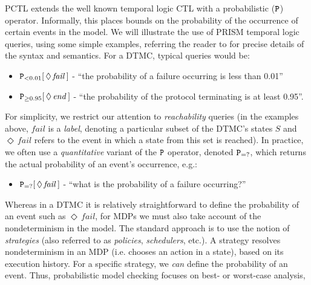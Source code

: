 \documentclass{llncs}
\begin{document}
PCTL extends the well known temporal logic CTL  with a probabilistic ($\tt P$) operator.
Informally, this places bounds on the probability of the occurrence of certain events in the model.
We will illustrate the use of PRISM temporal logic queries, using some simple examples,
referring the reader to \cite{HJ94,KNP07a} for precise details of the syntax and semantics.
For a DTMC, typical queries would be:
\begin{itemize}
\item ${\tt P}_{<0.01}[\,\Diamond\,\mathit{fail}\,]$ -
``the probability of a failure occurring is less than 0.01''
\item ${\tt P}_{\geq 0.95}[\,\Diamond\,\mathit{end}\,]$ -
``the probability of the protocol terminating is at least 0.95''.
\end{itemize}
For simplicity, we restrict our attention to \emph{reachability} queries
(in the examples above, $\mathit{fail}$ is a \emph{label}, denoting a particular subset of the DTMC's states $S$
and $\Diamond\,\mathit{fail}$ refers to the event in which a state from this set is reached).
%
In practice, we often use a \emph{quantitative} variant of the ${\tt P}$ operator,
denoted ${\tt P}_{=?}$, which returns the actual probability of an event's occurrence, e.g.:
\begin{itemize}
\item ${\tt P}_{=?}[\,\Diamond\,\mathit{fail}\,]$ -
``what is the probability of a failure occurring?''
\end{itemize}
Whereas in a DTMC it is relatively straightforward to define the probability
of an event such as $\Diamond\,\mathit{fail}$,
for MDPs we must also take account of the nondeterminism in the model.
The standard approach is to use the notion of
\emph{strategies} (also referred to as \emph{policies}, \emph{schedulers}, etc.).
A strategy resolves nondeterminism in an MDP (i.e. chooses an action in a state),
based on its execution history. %
For a specific strategy, we \emph{can} define the probability of an event.
Thus, probabilistic model checking focuses on best- or worst-case analysis,
\end{document}
